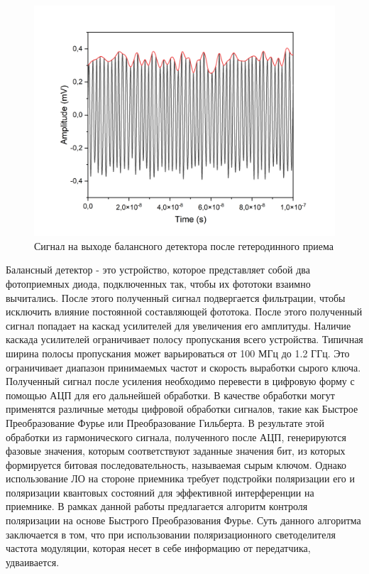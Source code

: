 \begin{figure}
    \centering
    \includegraphics[width=\textwidth]{images/balanced output heterodyne.png}
    \caption{Сигнал на выходе балансного детектора после гетеродинного приема}
    \label{fig:het time output}
\end{figure}
\newline Балансный детектор - это устройство, которое представляет собой два фотоприемных диода, подключенных так, чтобы их фототоки взаимно вычитались. После этого полученный сигнал подвергается фильтрации, чтобы исключить влияние постоянной составляющей фототока. После этого полученный сигнал попадает на каскад усилителей для увеличения его амплитуды. Наличие каскада усилителей ограничивает полосу пропускания всего устройства. Типичная ширина полосы пропускания может варьироваться от 100 МГц до 1.2 ГГц. Это ограничивает диапазон принимаемых частот и скорость выработки сырого ключа. 
\newline Полученный сигнал после усиления необходимо перевести в цифровую форму с помощью АЦП для его дальнейшей обработки. В качестве обработки могут применятся различные методы цифровой обработки сигналов, такие как Быстрое Преобразование Фурье или Преобразование Гильберта. В результате этой обработки из гармонического сигнала, полученного после АЦП, генерируются фазовые значения, которым соответствуют заданные значения бит, из которых формируется битовая последовательность, называемая сырым ключом. 
Однако использование ЛО на стороне приемника требует подстройки поляризации его и поляризации квантовых состояний для эффективной интерференции на приемнике. В рамках данной работы предлагается алгоритм контроля поляризации на основе Быстрого Преобразования Фурье. Суть данного алгоритма заключается в том, что при использовании поляризационного светоделителя частота модуляции, которая несет в себе информацию от передатчика, удваивается.
